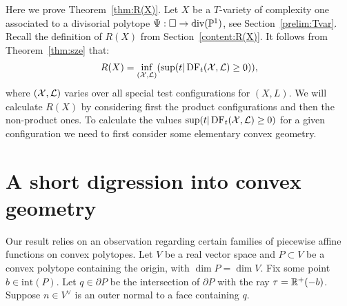 Here we prove Theorem~\ref{thm:R(X)}. Let \(X\) be a \(T\)-variety of complexity one associated to a divisorial polytope \(\Psi: \Box \to \text{div}(\mathbb{P}^1)\), see Section~\ref{prelim:Tvar}. Recall the definition of \(R(X)\) from Section~\ref{content:R(X)}.
It follows from Theorem~\ref{thm:sze} that:
\begin{align*}
R(X) = \inf_{({\mathcal{X}},\mathcal{L})}( \sup(t | \mathop{\rm DF}\nolimits_t({\mathcal{X}},\mathcal{L}) \ge 0) ),
\end{align*}
where \(({\mathcal{X}},\mathcal{L})\) varies over all special test configurations for \((X,L)\). We will calculate \(R(X)\) by considering first the product configurations and then the non-product ones. To calculate the values \(\sup(t | \mathop{\rm DF}\nolimits_t({\mathcal{X}},\mathcal{L}) \ge 0)\) for a given configuration we need to first consider some elementary convex geometry.
\section{A short digression into convex geometry}
Our result relies on an observation regarding certain families of piecewise affine functions on convex polytopes. Let \(V\) be a real vector space and \(P \subset V\) be a convex polytope containing the origin, with \(\dim P = \dim V\). Fix some point \(b \in \text{int}(P)\). Let \(q \in \partial P\) be the intersection of \(\partial P\) with the ray \(\tau = \mathbb{R}^+ (-b)\). Suppose \(n \in V^\vee\) is an outer normal to a face containing \(q\).

